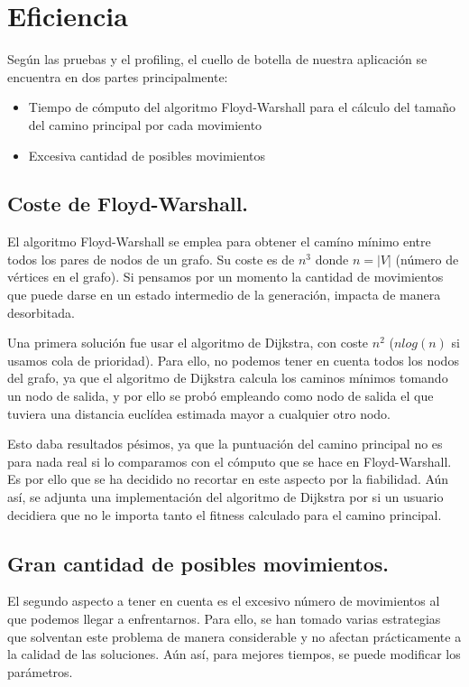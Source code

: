 \section{Eficiencia}

Según las pruebas y el profiling, el cuello de botella de nuestra aplicación se encuentra en dos partes principalmente:

\begin{itemize}
	\item Tiempo de cómputo del algoritmo Floyd-Warshall para el cálculo del tamaño del camino principal por cada movimiento
	\item Excesiva cantidad de posibles movimientos
\end{itemize}


\subsection*{Coste de Floyd-Warshall.}

El algoritmo Floyd-Warshall se emplea para obtener el camíno mínimo entre todos los pares de nodos de un grafo. Su coste es de $n^3$ donde $n = |V|$ (número de vértices en el grafo). Si pensamos por un momento la cantidad de movimientos que puede darse en un estado intermedio de la generación, impacta de manera desorbitada.

Una primera solución fue usar el algoritmo de Dijkstra, con coste $n^2$ ($n log(n)$ si usamos cola de prioridad). Para ello, no podemos tener en cuenta todos los nodos del grafo, ya que el algoritmo de Dijkstra calcula los caminos mínimos tomando un nodo de salida, y por ello se probó empleando como nodo de salida el que tuviera una distancia euclídea estimada mayor a cualquier otro nodo.

Esto daba resultados pésimos, ya que la puntuación del camino principal no es para nada real si lo comparamos con el cómputo que se hace en Floyd-Warshall. Es por ello que se ha decidido no recortar en este aspecto por la fiabilidad. Aún así, se adjunta una implementación del algoritmo de Dijkstra por si un usuario decidiera que no le importa tanto el fitness calculado para el camino principal.

\subsection*{Gran cantidad de posibles movimientos.}

El segundo aspecto a tener en cuenta es el excesivo número de movimientos al que podemos llegar a enfrentarnos. Para ello, se han tomado varias estrategias que solventan este problema de manera considerable y no afectan prácticamente a la calidad de las soluciones. Aún así, para mejores tiempos, se puede modificar los parámetros.


